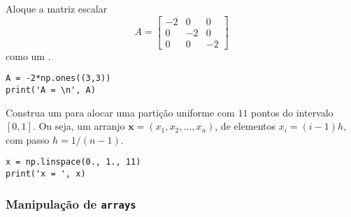 \begin{exer}
  Aloque a matriz escalar
\begin{equation}
    A = \begin{bmatrix}
      -2 & 0 & 0\\
      0 & -2 & 0\\
      0 & 0 & -2
    \end{bmatrix}
\end{equation}  como um {\PYTHONnumpyDOTarray}.
\end{exer}
\begin{resp}
  
\begin{lstlisting}
A = -2*np.ones((3,3))
print('A = \n', A)
\end{lstlisting}
\end{resp}

\begin{exer}
  Construa um {\PYTHONnumpyDOTarray} para alocar uma partição uniforme com $11$ pontos do intervalo $[0, 1]$. Ou seja, um arranjo $\pmb{x} = (x_1, x_2, \dotsc, x_n)$, de elementos $x_i = (i-1)h$, com passo $h = 1/(n-1)$. 
\end{exer}
\begin{resp}
  
\begin{lstlisting}
x = np.linspace(0., 1., 11)
print('x = ', x)
\end{lstlisting}

\end{resp}

\subsubsection{Manipulação de \texttt{arrays}}

